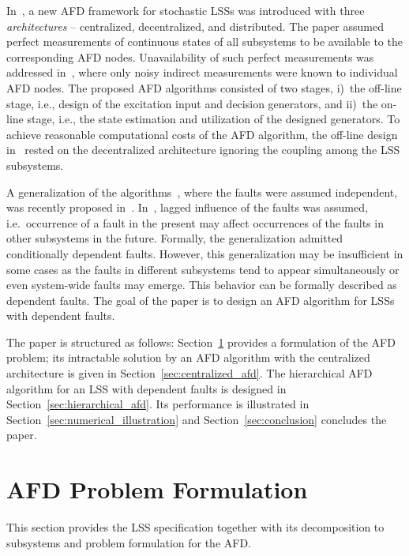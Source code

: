 \documentclass[conference,letterpaper]{IEEEtran}
\begin{document}
In~\cite{Puncochar2019:cp:ACC}, a new AFD framework for stochastic LSSs was introduced with three \emph{architectures} -- centralized, decentralized, and distributed. 
The paper assumed perfect measurements of continuous states of all subsystems to be available to the corresponding AFD nodes. 
Unavailability of such perfect measurements was addressed in~\cite{Straka2019:cp:FUSION}, where only noisy indirect measurements were known to individual AFD nodes. 
The proposed AFD algorithms consisted of two stages, i)~the off-line stage, i.e., design of the excitation input and decision generators, and ii)~the on-line stage, i.e., the state estimation and utilization of the designed generators.
To achieve reasonable computational costs of the AFD algorithm, the off-line design in~\cite{Puncochar2019:cp:ACC,Straka2019:cp:FUSION} rested on the decentralized architecture ignoring the coupling among the LSS subsystems. 

A generalization of the algorithms~\cite{Puncochar2019:cp:ACC,Straka2019:cp:FUSION}, where the faults were assumed independent, was recently proposed in~\cite{StraPu:20}.
In~\cite{StraPu:20}, lagged influence of the faults was assumed, i.e.\ occurrence of a fault in the present may affect occurrences of the faults in other subsystems in the future. 
Formally, the generalization admitted conditionally dependent faults.
However, this generalization may be insufficient in some cases as the faults in different subsystems tend to appear simultaneously or even system-wide faults may emerge. 
This behavior can be formally described as dependent faults.
The goal of the paper is to design an AFD algorithm for LSSs with dependent faults.

The paper is structured as follows: 
Section~\ref{sec:afd_problem_formulation} provides a formulation of the AFD problem; its intractable solution by an AFD algorithm with the centralized architecture is given in Section~\ref{sec:centralized_afd}.
The hierarchical AFD algorithm for an LSS with dependent faults is designed in Section~\ref{sec:hierarchical_afd}.
Its performance is illustrated in Section~\ref{sec:numerical_illustration} and Section~\ref{sec:conclusion} concludes the paper.
\section{AFD Problem Formulation}\label{sec:afd_problem_formulation}
This section provides the LSS specification together with its decomposition to subsystems and problem formulation for the AFD\@.
\end{document}
